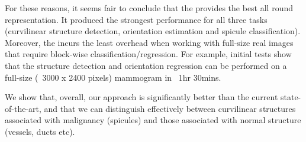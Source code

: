 For these reasons, it seems fair to conclude that the \dtcwt{} provides the best all round representation. It produced the strongest performance for all three tasks (curvilinear structure detection, orientation estimation and spicule classification). Moreover, the \dtcwt{} incurs the least overhead when working with full-size real images that require block-wise classification/regression. For example, initial tests show that the structure detection and orientation regression can be performed on a full-size (~3000 x 2400 pixels) mammogram in ~1hr 30mins.

We show that, overall, our approach is significantly better than the current state-of-the-art, and that we can distinguish effectively between curvilinear structures associated with malignancy (spicules) and those associated with normal structure (vessels, ducts etc).